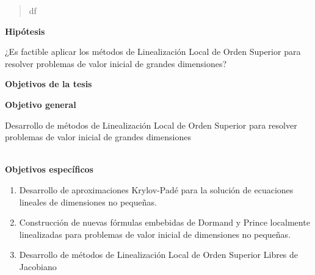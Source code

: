 \begin{abstract}
	df
\end{abstract}

\newpage

\begin{center}
	{\large \textbf{Hipótesis}}
\end{center}
¿Es factible aplicar los métodos de Linealización Local de Orden Superior para resolver problemas de valor inicial de grandes dimensiones?

\qquad

\begin{center}
	{\large \textbf{Objetivos de la tesis}}
\end{center}
\textbf{Objetivo general}

Desarrollo de métodos de Linealización Local de Orden Superior para resolver problemas de valor inicial de grandes dimensiones

\qquad\\
\textbf{Objetivos específicos}

\begin{enumerate}
	\item Desarrollo de aproximaciones Krylov-Padé para la solución de ecuaciones lineales de dimensiones no pequeñas.
	\item Construcción de nuevas fórmulas embebidas de Dormand y Prince localmente linealizadas para problemas de valor inicial de dimensiones no pequeñas.
	\item Desarrollo de métodos de Linealización Local de Orden Superior Libres de Jacobiano
\end{enumerate}
